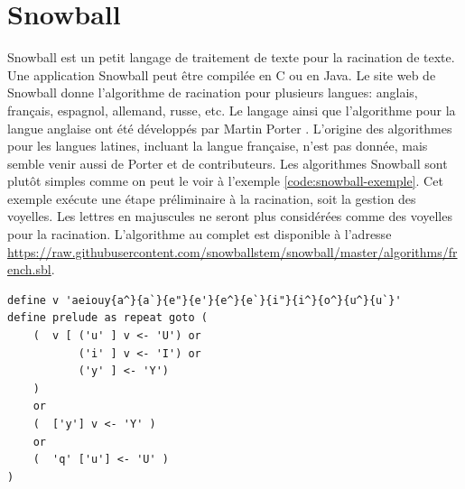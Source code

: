 \section{Snowball}
Snowball est un petit langage de traitement de texte pour la racination de texte.
Une application Snowball peut \^etre compil\'ee en C ou en Java.
Le site web de Snowball donne l'algorithme de racination pour plusieurs langues: anglais, fran\c{c}ais, espagnol, allemand, russe, etc.
Le langage ainsi que l'algorithme pour la langue anglaise ont \'et\'e d\'evelopp\'es par Martin Porter \cite{snowball}.
%
%
L'origine des algorithmes pour les langues latines, incluant la langue fran\c{c}aise, n'est pas donn\'ee, mais semble venir aussi de Porter et de contributeurs.
Les algorithmes Snowball sont plut\^ot simples comme on peut le voir \`a l'exemple \ref{code:snowball-exemple}.
Cet exemple ex\'ecute une \'etape pr\'eliminaire \`a la racination, soit la gestion des voyelles.
Les lettres en majuscules ne seront plus consid\'er\'ees comme des voyelles pour la racination.
L'algorithme au complet est disponible \`a l'adresse \url{https://raw.githubusercontent.com/snowballstem/snowball/master/algorithms/french.sbl}.
\begin{lstfloat}
\begin{lstlisting}[frame=l]
define v 'aeiouy{a^}{a`}{e"}{e'}{e^}{e`}{i"}{i^}{o^}{u^}{u`}'
define prelude as repeat goto (
    (  v [ ('u' ] v <- 'U') or
           ('i' ] v <- 'I') or
           ('y' ] <- 'Y')
    )
    or
    (  ['y'] v <- 'Y' )
    or
    (  'q' ['u'] <- 'U' )
)
\end{lstlisting}
\caption{Exemple de l'algorithme de racination en fran\c{c}ais en Snowball.}
\label{code:snowball-exemple}
\end{lstfloat}

